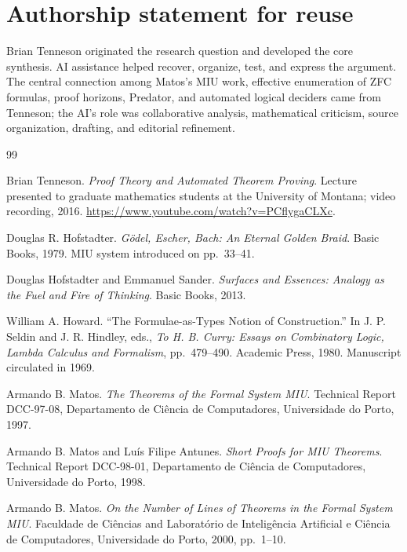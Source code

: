 \documentclass[11pt,oneside]{book}
\theoremstyle{definition}
\theoremstyle{remark}
\begin{document}
\section{Authorship statement for reuse}
Brian Tenneson originated the research question and developed the core synthesis. AI assistance helped recover, organize, test, and express the argument. The central connection among Matos's MIU work, effective enumeration of ZFC formulas, proof horizons, Predator, and automated logical deciders came from Tenneson; the AI's role was collaborative analysis, mathematical criticism, source organization, drafting, and editorial refinement.

\backmatter
\begin{thebibliography}{99}

Brian Tenneson.
\newblock \emph{Proof Theory and Automated Theorem Proving}.
\newblock Lecture presented to graduate mathematics students at the University of Montana; video recording, 2016.
\newblock \url{https://www.youtube.com/watch?v=PCflygaCLXc}.

Douglas R. Hofstadter.
\newblock \emph{G\"odel, Escher, Bach: An Eternal Golden Braid}.
\newblock Basic Books, 1979. MIU system introduced on pp.~33--41.

Douglas Hofstadter and Emmanuel Sander.
\newblock \emph{Surfaces and Essences: Analogy as the Fuel and Fire of Thinking}.
\newblock Basic Books, 2013.

William A. Howard.
\newblock ``The Formulae-as-Types Notion of Construction.''
\newblock In J. P. Seldin and J. R. Hindley, eds., \emph{To H. B. Curry: Essays on Combinatory Logic, Lambda Calculus and Formalism}, pp.~479--490. Academic Press, 1980. Manuscript circulated in 1969.

Armando B. Matos.
\newblock \emph{The Theorems of the Formal System MIU}.
\newblock Technical Report DCC-97-08, Departamento de Ci\^encia de Computadores, Universidade do Porto, 1997.

Armando B. Matos and Lu\'is Filipe Antunes.
\newblock \emph{Short Proofs for MIU Theorems}.
\newblock Technical Report DCC-98-01, Departamento de Ci\^encia de Computadores, Universidade do Porto, 1998.

Armando B. Matos.
\newblock \emph{On the Number of Lines of Theorems in the Formal System MIU}.
\newblock Faculdade de Ci\^encias and Laborat\'orio de Intelig\^encia Artificial e Ci\^encia de Computadores, Universidade do Porto, 2000, pp.~1--10.


\end{thebibliography}
\end{document}
